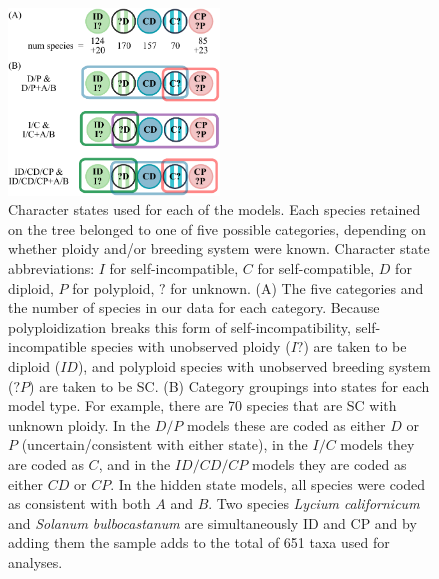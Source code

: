 \begin{figure}
\centering
\includegraphics[width=0.5\textwidth]{states.pdf} %
\caption{
Character states used for each of the models.
Each species retained on the tree belonged to one of five possible categories, depending on whether ploidy and/or breeding system were known. Character state abbreviations: $I$ for self-incompatible, $C$ for self-compatible, $D$ for diploid, $P$ for polyploid, $?$ for unknown.
(A) The five categories and the number of species in our data for each category.
Because polyploidization breaks this form of self-incompatibility, self-incompatible species with unobserved ploidy ($I?$) are taken to be diploid ($ID$), and polyploid species with unobserved breeding system ($?P$) are taken to be SC.
(B) Category groupings into states for each model type.
For example, there are 70 species that are SC with unknown ploidy. %
In the $D/P$ models these are coded as either $D$ or $P$ (uncertain/consistent with either state), in the $I/C$ models they are coded as $C$, and in the $ID/CD/CP$ models they are coded as either $CD$ or $CP$.
In the hidden state models, all species were coded as consistent with both $A$ and $B$. Two species \textit{Lycium californicum} and \textit{Solanum bulbocastanum} are simultaneously ID and CP and by adding them the sample adds to the total of 651 taxa used for analyses.
}
\label{figure:stateclassifications}
\end{figure}

\begin{suppfigure}
    \caption{ All models.  [This figure is provided as a separate, large-format page.] }
    \label{fig:allmodels}
\end{suppfigure}



